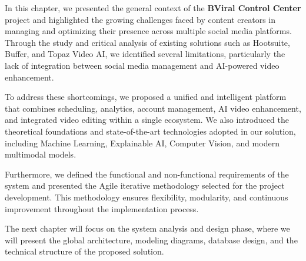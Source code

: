 In this chapter, we presented the general context of the \textbf{BViral Control Center} project and highlighted the growing challenges faced by content creators in managing and optimizing their presence across multiple social media platforms. Through the study and critical analysis of existing solutions such as Hootsuite, Buffer, and Topaz Video AI, we identified several limitations, particularly the lack of integration between social media management and AI-powered video enhancement.

To address these shortcomings, we proposed a unified and intelligent platform that combines scheduling, analytics, account management, AI video enhancement, and integrated video editing within a single ecosystem. We also introduced the theoretical foundations and state-of-the-art technologies adopted in our solution, including Machine Learning, Explainable AI, Computer Vision, and modern multimodal models.

Furthermore, we defined the functional and non-functional requirements of the system and presented the Agile iterative methodology selected for the project development. This methodology ensures flexibility, modularity, and continuous improvement throughout the implementation process.

The next chapter will focus on the system analysis and design phase, where we will present the global architecture, modeling diagrams, database design, and the technical structure of the proposed solution.